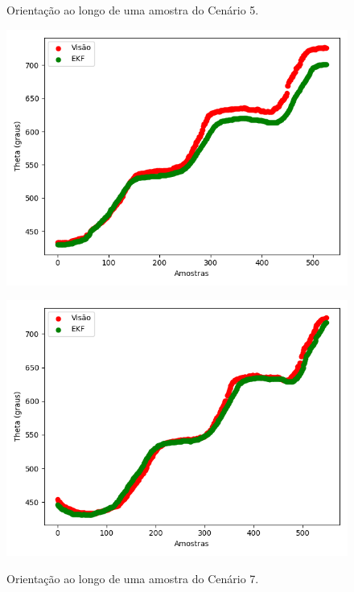 \documentclass[acronym, symbols, table]{fei}
\begin{document}
		\begin{figure}
			\centering
			\begin{minipage}[t]{0.47\textwidth}
				\centering
				\caption{Orientação ao longo de uma amostra do Cenário 5.}
				\includegraphics[width=\textwidth]{orientacao_imu_encoder.png}
				\label{fig:orientacao_imu_encoder}
			\end{minipage}
			\hspace{1em}
			\begin{minipage}[t]{0.47\textwidth}
				\centering
				\caption{Orientação ao longo de uma amostra do Cenário 7.}
				\includegraphics[width=\textwidth]{orientacao_encoder_imu.png}
				\label{fig:orientacao_encoder_imu}
			\end{minipage}
		\end{figure}
	
\end{document}
